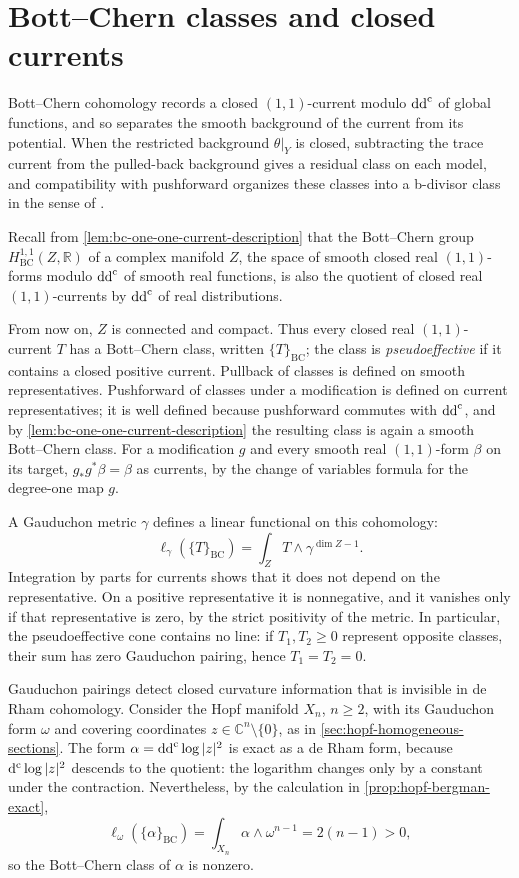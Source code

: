 \section{Bott--Chern classes and closed currents}\label{sec:bc-closed-currents}

Bott--Chern cohomology records a closed $(1,1)$-current modulo $\mathrm{dd}^{\mathrm{c}}$ of global functions, and so separates the smooth background of the current from its potential. When the restricted background $\theta|_Y$ is closed, subtracting the trace current from the pulled-back background gives a residual class on each model, and compatibility with pushforward organizes these classes into a b-divisor class in the sense of \cite[Section~11.1]{SGPT}.

Recall from \cref{lem:bc-one-one-current-description} that the Bott--Chern group $H^{1,1}_{\mathrm{BC}}(Z,\mathbb R)$ of a complex manifold $Z$, the space of smooth closed real $(1,1)$-forms modulo $\mathrm{dd}^{\mathrm{c}}$ of smooth real functions, is also the quotient of closed real $(1,1)$-currents by $\mathrm{dd}^{\mathrm{c}}$ of real distributions.

From now on, $Z$ is connected and compact. Thus every closed real $(1,1)$-current $T$ has a Bott--Chern class, written $\{T\}_{\mathrm{BC}}$; the class is \emph{pseudoeffective} if it contains a closed positive current. Pullback of classes is defined on smooth representatives. Pushforward of classes under a modification is defined on current representatives; it is well defined because pushforward commutes with $\mathrm{dd}^{\mathrm{c}}$, and by \cref{lem:bc-one-one-current-description} the resulting class is again a smooth Bott--Chern class. For a modification $g$ and every smooth real $(1,1)$-form $\beta$ on its target, $g_*g^*\beta=\beta$ as currents, by the change of variables formula for the degree-one map $g$.

A Gauduchon metric $\gamma$ defines a linear functional on this cohomology:
\[
 \ell_\gamma(\{T\}_{\mathrm{BC}})=\int_ZT\wedge\gamma^{\dim Z-1}.
\]
Integration by parts for currents shows that it does not depend on the representative. On a positive representative it is nonnegative, and it vanishes only if that representative is zero, by the strict positivity of the metric. In particular, the pseudoeffective cone contains no line: if $T_1,T_2\geq0$ represent opposite classes, their sum has zero Gauduchon pairing, hence $T_1=T_2=0$.

Gauduchon pairings detect closed curvature information that is invisible in de Rham cohomology. Consider the Hopf manifold $X_n$, $n\geq2$, with its Gauduchon form $\omega$ and covering coordinates $z\in\mathbb C^n\setminus\{0\}$, as in \cref{sec:hopf-homogeneous-sections}. The form $\alpha=\mathrm{dd}^{\mathrm{c}}\log|z|^2$ is exact as a de Rham form, because $\mathrm d^{\mathrm c}\log|z|^2$ descends to the quotient: the logarithm changes only by a constant under the contraction. Nevertheless, by the calculation in \cref{prop:hopf-bergman-exact},
\[
 \ell_\omega(\{\alpha\}_{\mathrm{BC}})
 =\int_{X_n}\alpha\wedge\omega^{n-1}=2(n-1)>0,
\]
so the Bott--Chern class of $\alpha$ is nonzero.

